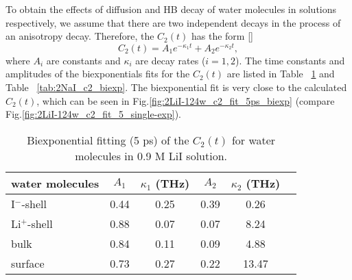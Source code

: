 To obtain the effects of diffusion and HB decay of water molecules
in solutions respectively, we assume that there are two independent 
decays in the process of an anisotropy decay. 
Therefore, the $C_2(t)$ has the form [\cite{TanHS05}]
\begin{equation}
C_2(t)=A_1e^{-\kappa_1 t} +A_2e^{-\kappa_2 t},
\label{eq:tcf3}
\end{equation}
where $A_i$ are constants and $\kappa_i$ are decay rates ($i=1,2$). 
The time constants and amplitudes of the biexponentials fits for 
the $C_2(t)$ are listed in Table ~\ref{tab:2LiI_c2_biexp} and Table ~\ref{tab:2NaI_c2_biexp}.
The biexponential fit is very close to the calculated $C_2(t)$, which can be seen in Fig.\space\ref{fig:2LiI-124w_c2_fit_5ps_biexp} (compare Fig.\space\ref{fig:2LiI-124w_c2_fit_5_single-exp}).
%
\begin{table}[hbt]
\centering
\caption{\label{tab:2LiI_c2_biexp}%
	Biexponential fitting (5 ps) of the $C_2(t)$ for water molecules in 0.9 M LiI solution.}
\begin{tabular}{lccccc}
water molecules & $A_1$  & $\kappa_1$ (THz) & $A_2$ & $\kappa_2$ (THz) \\
\hline
I$^-$-shell & 0.44 & 0.25 & 0.39 & 0.26\\
Li$^+$-shell & 0.88 & 0.07 & 0.07 & 8.24\\
bulk & 0.84 & 0.11 & 0.09 & 4.88 \\
surface & 0.73 & 0.27 & 0.22 & 13.47 \\
\end{tabular}
\end{table}

